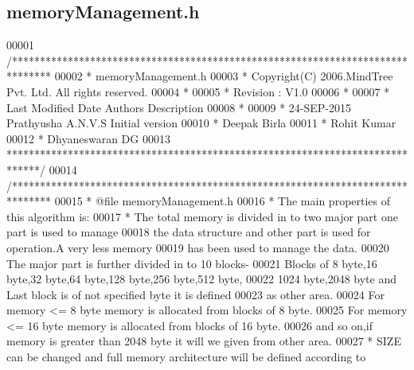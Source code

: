 \hypertarget{memory_management_8h_source}{}\subsection{memory\+Management.\+h}
\label{memory_management_8h_source}

\begin{DoxyCode}
00001 \textcolor{comment}{/*******************************************************************************                           
                 }
00002 \textcolor{comment}{ *                        memoryManagement.h}
00003 \textcolor{comment}{ * Copyright(C) 2006.MindTree Pvt. Ltd. All rights reserved.}
00004 \textcolor{comment}{ *}
00005 \textcolor{comment}{ * Revision : V1.0}
00006 \textcolor{comment}{ *}
00007 \textcolor{comment}{ * Last Modified Date    Authors                         Description}
00008 \textcolor{comment}{ *}
00009 \textcolor{comment}{ * 24-SEP-2015           Prathyusha A.N.V.S              Initial version}
00010 \textcolor{comment}{ *                       Deepak Birla}
00011 \textcolor{comment}{ *           Rohit Kumar}
00012 \textcolor{comment}{ *           Dhyaneswaran DG}
00013 \textcolor{comment}{ ******************************************************************************/}
00014 \textcolor{comment}{/*******************************************************************************}
00015 \textcolor{comment}{ * @file memoryManagement.h}
00016 \textcolor{comment}{ * The main properties of this algorithm is:}
00017 \textcolor{comment}{ * The total memory is divided in to two major part one part is used to manage }
00018 \textcolor{comment}{   the data structure and other part is used for operation.A very less memory }
00019 \textcolor{comment}{   has been used to manage the data.}
00020 \textcolor{comment}{   The major part is further divided in to 10 blocks-}
00021 \textcolor{comment}{   Blocks of 8 byte,16 byte,32 byte,64 byte,128 byte,256 byte,512 byte,}
00022 \textcolor{comment}{   1024 byte,2048 byte and Last block is of not specified byte it is defined }
00023 \textcolor{comment}{   as other area.}
00024 \textcolor{comment}{   For memory <= 8 byte memory is allocated from blocks of 8 byte.}
00025 \textcolor{comment}{   For memory <= 16 byte memory is allocated from blocks of 16 byte.}
00026 \textcolor{comment}{   and so on,if memory is greater than 2048 byte it will we given from other area.}
00027 \textcolor{comment}{ * SIZE can be changed and full memory architecture will be defined according to }

\end{DoxyCode}
